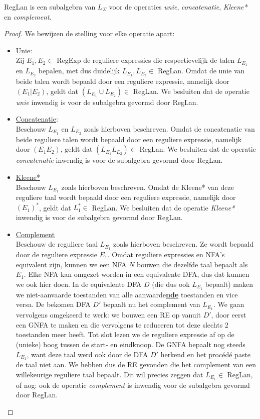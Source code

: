 \documentclass[../aanvullingen_cursus.tex]{subfiles}
\begin{document}
\begin{stelling}
	RegLan is een subalgebra van \(L_{\Sigma}\) voor de operaties \textit{unie}, \textit{concatenatie}, \textit{Kleene*} en \textit{complement}.
\end{stelling}

\begin{proof}
	We bewijzen de stelling voor elke operatie apart:

	\begin{itemize}

		\item \underline{Unie}:\\
		Zij \(E_1,E_2 \in \) RegExp de reguliere expressies die respectievelijk de talen \(L_{E_1}\) en \(L_{E_2}\) bepalen, met dus duidelijk \(L_{E_1},L_{E_2} \in \) RegLan. Omdat de unie van beide talen wordt bepaald door een reguliere expressie, namelijk door \((E_1|E_2)\), geldt dat \((L_{E_1}\cup L_{E_2}) \in \) RegLan. We besluiten dat de operatie \textit{unie} inwendig is voor de subalgebra gevormd door RegLan.
		\item \underline{Concatenatie}:\\
		Beschouw \(L_{E_1}\) en \(L_{E_2}\) zoals hierboven beschreven. Omdat de concatenatie van beide reguliere talen wordt bepaald door een reguliere expressie, namelijk door \((E_1E_2)\), geldt dat \((L_{E_1}L_{E_2}) \in \) RegLan. We besluiten dat de operatie \textit{concatenatie} inwendig is voor de subalgebra gevormd door RegLan.
		\item \underline{Kleene*}\\
		Beschouw \(L_{E_1}\) zoals hierboven beschreven. Omdat de Kleene* van deze reguliere taal wordt bepaald door een reguliere expressie, namelijk door \((E_1)^*\), geldt dat \(L_1^* \in\) RegLan. We besluiten dat de operatie \textit{Kleene*} inwendig is voor de subalgebra gevormd door RegLan.
		\item \underline{Complement}\\
		Beschouw de reguliere taal \(L_{E_1}\) zoals hierboven beschreven. Ze wordt bepaald door de reguliere expressie \(E_1\). Omdat reguliere expressies en NFA's equivalent zijn, kunnen we een NFA \(N\) bouwen die dezelfde taal bepaalt als \(E_1\). Elke NFA kan omgezet worden in een equivalente DFA, dus dat kunnen we ook hier doen. In de equivalente DFA \(D\) (die dus ook \(L_{E_1}\) bepaalt) maken we niet-aanvaarde toestanden van alle aanvaarde\underline{\textbf{nde}} toestanden en vice versa. De bekomen DFA \(D'\) bepaalt nu het complement van \(L_{E_1}\). We gaan vervolgens omgekeerd te werk: we bouwen een RE op vanuit \(D'\), door eerst een GNFA te maken en die vervolgens te reduceren tot deze slechts 2 toestanden meer heeft. Tot slot lezen we de reguliere expressie af op de (unieke) boog tussen de start- en eindknoop. De GNFA bepaalt nog steeds \(\bar{L}_{E_1}\), want deze taal werd ook door de DFA \(D'\) herkend en het procédé paste de taal niet aan. We hebben dus de RE gevonden die het complement van een willekeurige reguliere taal bepaalt. Dit wil precies zeggen dat \(\bar{L}_{E_1} \in \) RegLan, of nog: ook de operatie \textit{complement} is inwendig voor de subalgebra gevormd door RegLan.


\end{itemize}
\end{proof}
\end{document}
